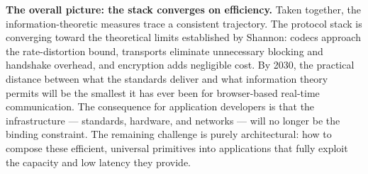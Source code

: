 \textbf{The overall picture: the stack converges on efficiency.}
Taken together, the information-theoretic measures trace a consistent
trajectory. The protocol stack is converging toward the theoretical limits
established by Shannon: codecs approach the rate-distortion bound, transports
eliminate unnecessary blocking and handshake overhead, and encryption adds
negligible cost. By 2030, the practical distance between what the standards
deliver and what information theory permits will be the smallest it has ever
been for browser-based real-time communication. The consequence for
application developers is that the infrastructure --- standards, hardware,
and networks --- will no longer be the binding constraint. The remaining
challenge is purely architectural: how to compose these efficient, universal
primitives into applications that fully exploit the capacity and low latency
they provide.
